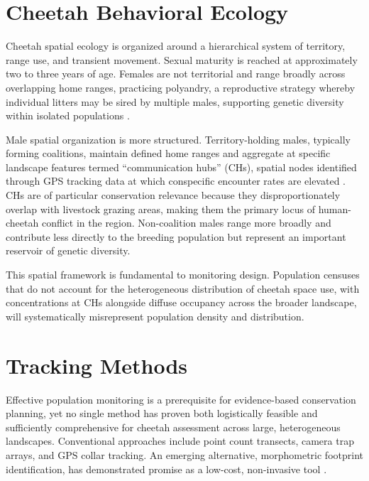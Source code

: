 \documentclass[12pt, letterpaper]{article}
\begin{document}
\section{Cheetah Behavioral Ecology}

Cheetah spatial ecology is organized around a hierarchical system of territory, range use, and
transient movement. Sexual maturity is reached at approximately two to three years of age.
Females are not territorial and range broadly across overlapping home ranges, practicing
polyandry, a reproductive strategy whereby individual litters may be sired by multiple males,
supporting genetic diversity within isolated populations \citep{Melzheimer2020}.

Male spatial organization is more structured. Territory-holding males, typically forming
coalitions, maintain defined home ranges and aggregate at specific landscape features termed
``communication hubs'' (CHs), spatial nodes identified through GPS tracking data at which
conspecific encounter rates are elevated \citep{Melzheimer2020}. CHs are of particular
conservation relevance because they disproportionately overlap with livestock grazing areas,
making them the primary locus of human-cheetah conflict in the region. Non-coalition males
range more broadly and contribute less directly to the breeding population but represent an
important reservoir of genetic diversity.

This spatial framework is fundamental to monitoring design. Population censuses that do not
account for the heterogeneous distribution of cheetah space use, with concentrations at CHs
alongside diffuse occupancy across the broader landscape, will systematically misrepresent
population density and distribution.

\section{Tracking Methods}

Effective population monitoring is a prerequisite for evidence-based conservation planning, yet
no single method has proven both logistically feasible and sufficiently comprehensive for
cheetah assessment across large, heterogeneous landscapes. Conventional approaches include
point count transects, camera trap arrays, and GPS collar tracking. An emerging alternative,
morphometric footprint identification, has demonstrated promise as a low-cost, non-invasive
tool \citep{Baralle2021}.
\end{document}
